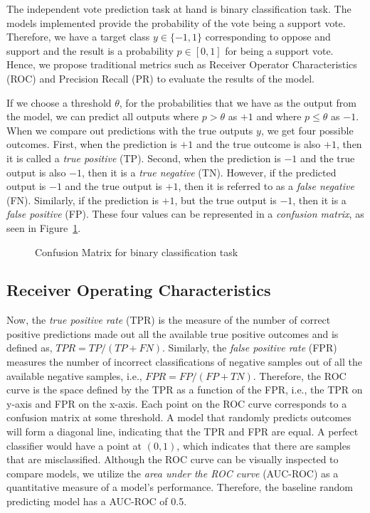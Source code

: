 The independent vote prediction task at hand is binary classification task.
The models implemented provide the probability of the vote being a support vote.
Therefore, we have a target class $y \in \{-1,1\}$ corresponding to oppose and support and the result is a probability $p \in [0,1]$ for being a support vote.
Hence, we propose traditional metrics such as Receiver Operator Characteristics (ROC) and Precision Recall (PR) to evaluate the results of the model.

If we choose a threshold $\theta$, for the probabilities that we have as the output from the model, we can predict all outputs where $p>\theta$ as $+1$ and where $p \leq \theta$ as $-1$.
When we compare out predictions with the true outputs $y$, we get four possible outcomes.
First, when the prediction is $+1$ and the true outcome is also $+1$, then it is called a \textit{true positive} (TP). Second, when the prediction is $-1$ and the true output is also $-1$, then it is a \textit{true negative} (TN). However, if the predicted output is $-1$ and the true output is $+1$, then it is referred to as a \textit{false negative} (FN). Similarly, if the prediction is $+1$, but the true output is $-1$, then it is a \textit{false positive} (FP). These four values can be represented in a \textit{confusion matrix}, as seen in Figure~\ref{fig:confusion-matrix}.

\begin{figure}[htp]
    \centering
    
    \caption{Confusion Matrix for binary classification task}
    \label{fig:confusion-matrix}
\end{figure}

\subsection{Receiver Operating Characteristics}
Now, the \textit{true positive rate} (TPR) is the measure of the number of correct positive predictions made out all the available true positive outcomes and is defined as, $TPR = TP/(TP+FN)$.
Similarly, the \textit{false positive rate} (FPR) measures the number of incorrect classifications of negative samples out of all the available negative samples, i.e., $FPR = FP/(FP+TN)$.
Therefore, the ROC curve is the space defined by the TPR as a function of the FPR, i.e., the TPR on y-axis and FPR on the x-axis. 
Each point on the ROC curve corresponds to a confusion matrix at some threshold.
A model that randomly predicts outcomes will form a diagonal line, indicating that the TPR and FPR are equal.
A perfect classifier would have a point at $(0,1)$, which indicates that there are samples that are misclassified.
Although the ROC curve can be visually inspected to compare models, we utilize the \textit{area under the ROC curve} (AUC-ROC) as a quantitative measure of a model's performance.
Therefore, the baseline random predicting model has a AUC-ROC of 0.5.


